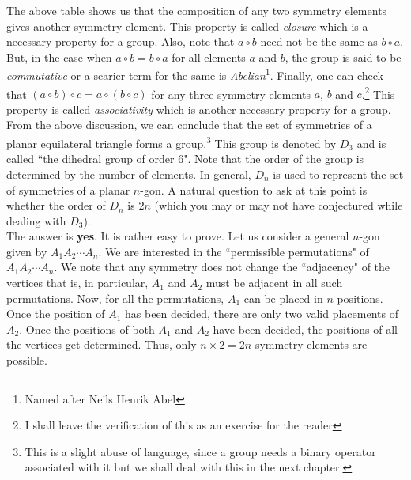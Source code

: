 The above table shows us that the composition of any two symmetry elements gives another symmetry element. This property is called \textit{closure} which is a necessary property for a group. Also, note that $a\circ b$ need not be the same as $b\circ a$. But, in the case when $a\circ b=b\circ a$ for all elements $a$ and $b$, the group is said to be \textit{commutative} or a scarier term for the same is \textit{Abelian}\footnote{Named after Neils Henrik Abel}. Finally, one can check that $(a\circ b)\circ c=a\circ(b\circ c)$ for any three symmetry elements $a$, $b$ and $c$.\footnote{I shall leave the verification of this as an exercise for the reader} This property is called \textit{associativity} which is another necessary property for a group.\\

From the above discussion, we can conclude that the set of symmetries of a planar equilateral triangle forms a group.\footnote{This is a slight abuse of language, since a group needs a binary operator associated with it but we shall deal with this in the next chapter.} This group is denoted by $D_3$ and is called ``the dihedral group of order $6$". Note that the order of the group is determined by the number of elements. In general, $D_n$ is used to represent the set of symmetries of a planar $n$-gon. A natural question to ask at this point is whether the order of $D_n$ is $2n$ (which you may or may not have conjectured while dealing with $D_3$).\\
The answer is \textbf{yes}. It is rather easy to prove. Let us consider a general $n$-gon given by $A_1A_2\cdots A_n$. We are interested in the ``permissible permutations" of $A_1A_2\cdots A_n$. We note that any symmetry does not change the ``adjacency" of the vertices that is, in particular, $A_1$ and $A_2$ must be adjacent in all such permutations. Now, for all the permutations, $A_1$ can be placed in $n$ positions. Once the position of $A_1$ has been decided, there are only two valid placements of $A_2$. Once the positions of both $A_1$ and $A_2$ have been decided, the positions of all the vertices get determined. Thus, only $n\times2=2n$ symmetry elements are possible.




